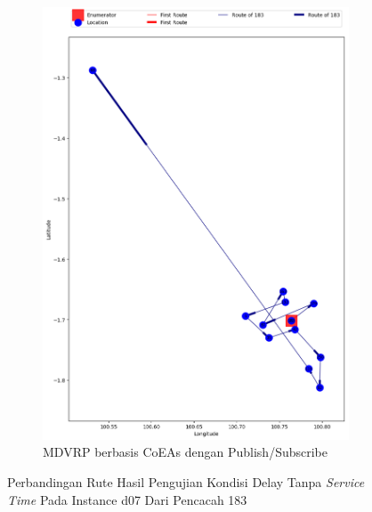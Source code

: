 \begin{figure}[H]\ContinuedFloat
	\centering
	\begin{subfigure}[t]{\textwidth}
		\centering
		\includegraphics[width=\textwidth]{Resources/Images/delayed_7/real_m15_n100_delayed_7_183_pubsub_coes}
		\caption{MDVRP berbasis CoEAs dengan Publish/Subscribe}
		\label{fig:real_m15_n100_delayed_7_183_pubsub_coes}
	\end{subfigure}
	\caption{Perbandingan Rute Hasil Pengujian Kondisi Delay Tanpa \textit{Service Time} Pada Instance d07 Dari Pencacah 183}
	\label{fig:real_m15_n100_delayed_7_183_contd}
\end{figure}


